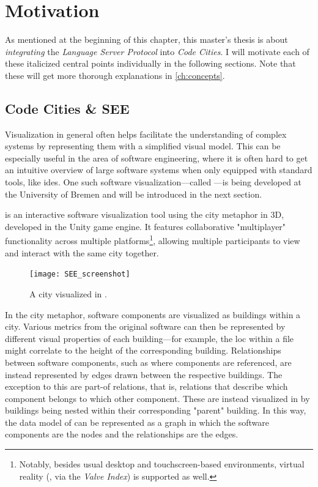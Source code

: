 \documentclass[../thesis]{subfiles}
\begin{document}
\section{Motivation}
As mentioned at the beginning of this chapter, this master's thesis is about \emph{integrating} the \emph{Language Server Protocol} into \emph{Code Cities}.
I will motivate each of these italicized central points individually in the following sections.
Note that these will get more thorough explanations in \cref{ch:concepts}.

\subsection{Code Cities \& SEE}\label{subsec:see}
Visualization in general often helps facilitate the understanding of complex systems by representing them with a simplified visual model.
This can be especially useful in the area of software engineering, where it is often hard to get an intuitive overview of large software systems when only equipped with standard tools, like \glspl{ide}.
One such software visualization---called \SEE{}---is being developed at the University of Bremen and will be introduced in the next section.

\SEE{} is an interactive software visualization tool using the \gls*{city} metaphor in 3D, developed in the {Unity} game engine.
It features collaborative "multiplayer" functionality across multiple platforms\footnote{
	Notably, besides usual desktop and touchscreen-based environments, virtual reality (\eg, via the \emph{Valve Index}) is supported as well.
}, allowing multiple participants to view and interact with the same \gls*{city} together.

\begin{figure}[hbtp]
	\centering
	\texttt{[image: SEE\_screenshot]}
	\caption{A \gls{city} visualized in \SEE{}.}\label{fig:city}
\end{figure}

In the \gls{city} metaphor, software components are visualized as buildings within a city.
Various metrics from the original software can then be represented by different visual properties of each building---for example, the \gls{loc} within a file might correlate to the height of the corresponding building.
Relationships between software components, such as where components are referenced, are instead represented by edges drawn between the respective buildings.
The exception to this are part-of relations, that is, relations that describe which component belongs to which other component.
These are instead visualized in \SEE{} by buildings being nested within their corresponding "parent" building.
In this way, the data model of \SEE{} can be represented as a graph in which the software components are the nodes and the relationships are the edges.
\end{document}
